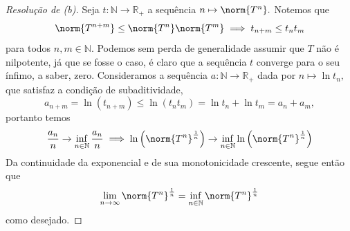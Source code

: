 \begin{proof}[Resolução de (b)]
  Seja \(t : \mathbb{N} \to \mathbb{R}_+\) a sequência \(n \mapsto \norm{T^n}.\) Notemos que
  \begin{equation*}
    \norm{T^{n + m}} \leq \norm{T^n} \norm{T^m} \implies t_{n+m} \leq t_n t_m
  \end{equation*}
  para todos \(n, m \in \mathbb{N}.\) Podemos sem perda de generalidade assumir que \(T\) não é nilpotente, já que se fosse o caso, é claro que a sequência \(t\) converge para o seu ínfimo, a saber, zero. Consideramos a sequência \(a : \mathbb{N} \to \mathbb{R}_+\) dada por \(n \mapsto \ln t_n,\) que satisfaz a condição de subaditividade,
  \begin{equation*}
    a_{n + m} = \ln(t_{n+m}) \leq \ln(t_n t_m) = \ln t_n + \ln t_m = a_n + a_m,
  \end{equation*}
  portanto temos
  \begin{equation*}
    \frac{a_n}{n} \to \inf_{n \in \mathbb{N}}{\frac{a_n}{n}} \implies \ln\left(\norm{T^n}^{\frac1n}\right) \to \inf_{n\in \mathbb{N}}{\ln\left(\norm{T^n}^{\frac1n}\right)}
  \end{equation*}
  Da continuidade da exponencial e de sua monotonicidade crescente, segue então que
  \begin{equation*}
    \lim_{n\to \infty}{\norm{T^n}^{\frac{1}{n}}} = \inf_{n \in \mathbb{N}}{\norm{T^n}^{\frac1n}}
  \end{equation*}
  como desejado.
\end{proof}
